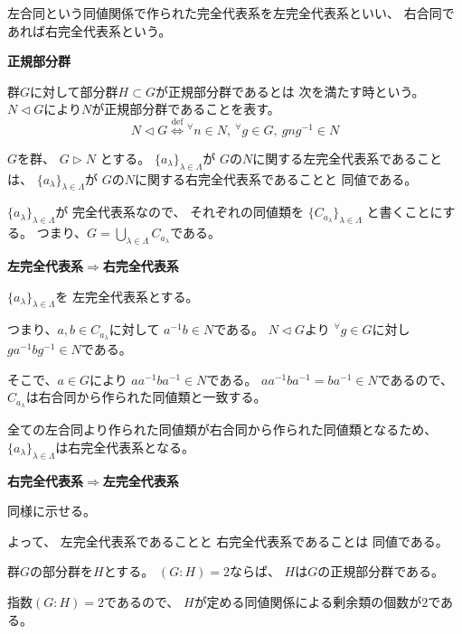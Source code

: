 \documentclass[12pt,b5paper]{ltjsarticle}
\begin{document}
左合同という同値関係で作られた完全代表系を左完全代表系といい、
右合同であれば右完全代表系という。

\hrulefill

\textbf{正規部分群}

群$G$に対して部分群$H\subset G$が正規部分群であるとは
次を満たす時という。
$N \triangleleft G$により$N$が正規部分群であることを表す。
\begin{equation}
 N \triangleleft G
  \overset{\mathrm{def}}{\iff}
  {}^{\forall}n\in N,\: {}^{\forall}g\in G, \: gng^{-1}\in N
\end{equation}


\hrulefill

$G$を群、
$G \triangleright N$
とする。
$\{ a_{\lambda}\}_{\lambda \in \Lambda}$が
$G$の$N$に関する左完全代表系であることは、
$\{ a_{\lambda}\}_{\lambda \in \Lambda}$が
$G$の$N$に関する右完全代表系であることと
同値である。


\dotfill

$\{ a_{\lambda}\}_{\lambda \in \Lambda}$が
完全代表系なので、
それぞれの同値類を
$\{ C_{a_{\lambda}} \}_{\lambda \in \Lambda}$
と書くことにする。
つまり、$G=\bigcup_{\lambda \in \Lambda} C_{a_{\lambda}}$である。

\textbf{左完全代表系$\Rightarrow$右完全代表系}

$\{ a_{\lambda}\}_{\lambda \in \Lambda}$を
左完全代表系とする。

つまり、$a,b \in C_{a_{\lambda}}$に対して
$a^{-1}b \in N$である。
$N\triangleleft G$より
${}^{\forall}g\in G$に対し
$ga^{-1}bg^{-1} \in N$である。

そこで、$a\in G$により
$aa^{-1}ba^{-1} \in N$である。
$aa^{-1}ba^{-1} =ba^{-1} \in N$であるので、
$C_{a_{\lambda}}$は右合同から作られた同値類と一致する。

全ての左合同より作られた同値類が右合同から作られた同値類となるため、
$\{ a_{\lambda}\}_{\lambda \in \Lambda}$は右完全代表系となる。

\textbf{右完全代表系$\Rightarrow$左完全代表系}

同様に示せる。


よって、
左完全代表系であることと
右完全代表系であることは
同値である。


\hrulefill

群$G$の部分群を$H$とする。
$(G:H)=2$ならば、
$H$は$G$の正規部分群である。

\dotfill

指数$(G:H)=2$であるので、
$H$が定める同値関係による剰余類の個数が$2$である。
\end{document}
